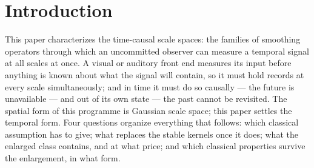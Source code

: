 
\section{Introduction}\label{sec:introduction}

This paper characterizes the time-causal scale spaces: the families of smoothing operators
through which an uncommitted observer can measure a temporal signal at all scales at once.
A visual or auditory front end measures its input before anything is known about what the
signal will contain, so it must hold records at every scale simultaneously; and in time it
must do so causally --- the future is unavailable --- and out of its own state --- the past
cannot be revisited. The spatial form of this programme is Gaussian scale space; this paper
settles the temporal form. Four questions organize everything that follows: which
classical assumption has to give; what replaces the stable kernels once it does; what the
enlarged class contains, and at what price; and which classical properties survive the
enlargement, in what form.

